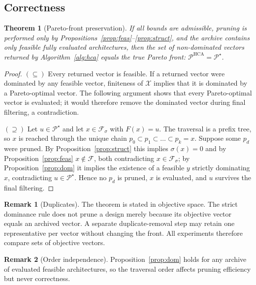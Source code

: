 \documentclass[preprint,11pt,3p]{elsarticle}
\theoremstyle{plain}
\newtheorem{theorem}{Theorem}
\theoremstyle{definition}
\newtheorem{remark}{Remark}
\newcommand{\X}{\mathcal{X}}
\newcommand{\F}{\mathcal{F}}
\newcommand{\PS}{\mathcal{P}^{\star}}
\begin{document}
\subsection{Correctness}

\begin{theorem}[Pareto-front preservation]
\label{thm:exact}
If all bounds are admissible, pruning is performed only by
Propositions~\ref{prop:feas}--\ref{prop:struct}, and the archive contains only feasible
fully evaluated architectures, then the set of non-dominated vectors returned by
Algorithm~\ref{alg:hca} equals the true Pareto front:
$\mathcal{P}^{\mathrm{HCA}}=\PS$.
\end{theorem}
\begin{proof}
$(\subseteq)$ Every returned vector is feasible. If a returned vector
were dominated by any feasible vector, finiteness of $\X$ implies that it is
dominated by a Pareto-optimal vector. The following argument shows that every
Pareto-optimal vector is evaluated; it would therefore remove the dominated
vector during final filtering, a contradiction.

$(\supseteq)$ Let $u\in\PS$ and let $x\in\F_\sigma$ with $F(x)=u$. The traversal is a
prefix tree, so $x$ is reached through the unique chain
$p_0\subset p_1\subset\dots\subset p_k=x$. Suppose some $p_d$ were pruned. By
Proposition~\ref{prop:struct} this implies $\sigma(x)=0$ and by
Proposition~\ref{prop:feas} $x\notin\F$, both contradicting $x\in\F_\sigma$; by
Proposition~\ref{prop:dom} it implies the existence of a feasible $y$ strictly dominating
$x$, contradicting $u\in\PS$. Hence no $p_d$ is pruned, $x$ is evaluated, and $u$ survives
the final filtering.
\end{proof}

\begin{remark}[Duplicates]
The theorem is stated in objective space. The strict dominance rule does not prune a design merely because its
objective vector equals an archived vector. A separate duplicate-removal step may
retain one representative per vector without changing the front. All experiments therefore compare sets of objective
vectors.
\end{remark}

\begin{remark}[Order independence]
Proposition~\ref{prop:dom} holds for any archive of evaluated feasible architectures, so
the traversal order affects pruning efficiency but never correctness.
\end{remark}
\end{document}
